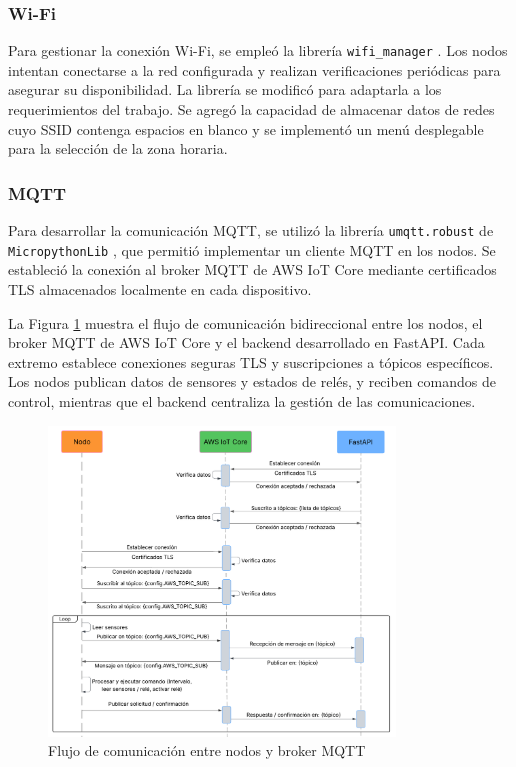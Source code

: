 \subsubsection{Wi-Fi}

Para gestionar la conexión Wi-Fi, se empleó la librería \texttt{wifi\_manager}
\cite{MicroPythonWifiManager}. Los nodos intentan conectarse a la red
configurada y realizan verificaciones periódicas para asegurar su
disponibilidad. La librería se modificó para adaptarla a los requerimientos del
trabajo. Se agregó la capacidad de almacenar datos de redes cuyo SSID contenga
espacios en blanco y se implementó un menú desplegable para la selección de la
zona horaria.

\subsubsection{MQTT}

Para desarrollar la comunicación MQTT, se utilizó la librería
\texttt{umqtt.robust} de \texttt{MicropythonLib} \cite{MicropythonLib}, que
permitió implementar un cliente MQTT en los nodos. Se estableció la conexión al
broker MQTT de AWS IoT Core mediante certificados TLS almacenados localmente en
cada dispositivo.

La Figura \ref{fig:secuencia_mqtt} muestra el flujo de comunicación
bidireccional entre los nodos, el broker MQTT de AWS IoT Core y el backend
desarrollado en FastAPI. Cada extremo establece conexiones seguras TLS y
suscripciones a tópicos específicos. Los nodos publican datos de sensores y
estados de relés, y reciben comandos de control, mientras que el backend
centraliza la gestión de las comunicaciones.

\begin{figure}[H]
    \centering
    \includegraphics[width=0.82\textwidth]{./Images/31_secuencia_mqtt.png}
    \caption{Flujo de comunicación entre nodos y broker MQTT}
    \label{fig:secuencia_mqtt}
\end{figure}

